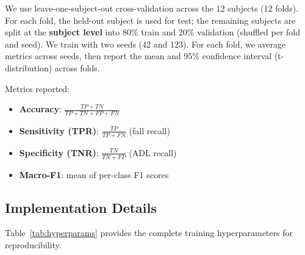 \documentclass{article}
\begin{document}
We use leave-one-subject-out cross-validation across the 12 subjects (12 folds). For each fold, the held-out subject is used for test; the remaining subjects are split at the \textbf{subject level} into 80\% train and 20\% validation (shuffled per fold and seed). We train with two seeds (42 and 123). For each fold, we average metrics across seeds, then report the mean and 95\% confidence interval (t-distribution) across folds.

Metrics reported:
\begin{itemize}
    \item \textbf{Accuracy}: $\frac{TP+TN}{TP+TN+FP+FN}$
    \item \textbf{Sensitivity (TPR)}: $\frac{TP}{TP+FN}$ (fall recall)
    \item \textbf{Specificity (TNR)}: $\frac{TN}{TN+FP}$ (ADL recall)
    \item \textbf{Macro-F1}: mean of per-class F1 scores
\end{itemize}

\subsection{Implementation Details}

Table~\ref{tab:hyperparams} provides the complete training hyperparameters for reproducibility.
\end{document}
